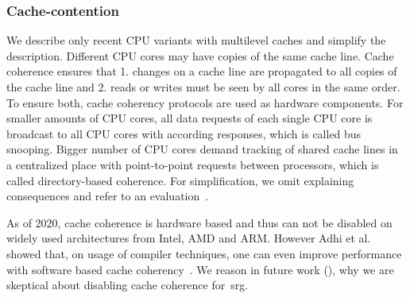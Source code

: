 \documentclass{article}
\begin{document}
\subsubsection{Cache-contention}\label{subsubsec:datacontentionthreads}
We describe only recent CPU variants with multilevel caches and simplify the description.
Different CPU cores may have copies of the same cache line.
Cache coherence ensures that 1. changes on a cache line are propagated to all copies of the cache line and 2. reads or writes must be seen by all cores in the same order.
To ensure both, cache coherency protocols are used as hardware components.
For smaller amounts of CPU cores, all data requests of each single CPU core is broadcast to all CPU cores with according responses, which is called bus snooping.
Bigger number of CPU cores demand tracking of shared cache lines in a centralized place with point-to-point requests between processors, which is called directory-based coherence.
For simplification, we omit explaining consequences and refer to an evaluation~\cite{al-manasia2015}.
\par
As of 2020, cache coherence is hardware based and thus can not be disabled on widely used architectures from Intel, AMD and ARM.
However Adhi et al. showed that, on usage of compiler techniques, one can even improve performance with software based cache coherency~\cite{adhi2019}.
We reason in future work (), why we are skeptical about disabling cache coherence for~\ac{srg}.
\end{document}
